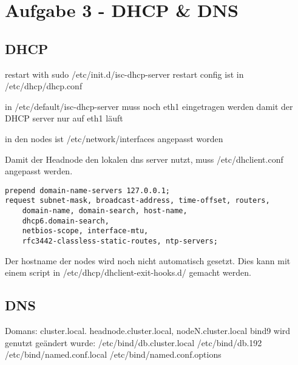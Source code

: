 \chapter{Aufgabe 3 - DHCP \& DNS}
\section{DHCP}
restart with
sudo /etc/init.d/isc-dhcp-server restart
config ist in /etc/dhcp/dhcp.conf

in /etc/default/isc-dhcp-server muss noch eth1 eingetragen werden damit der DHCP server nur auf eth1 läuft

in den nodes ist /etc/network/interfaces angepasst worden

Damit der Headnode den lokalen dns server nutzt, muss /etc/dhclient.conf angepasst werden.

\begin{lstlisting}[style=Bash]
prepend domain-name-servers 127.0.0.1;
request subnet-mask, broadcast-address, time-offset, routers,
	domain-name, domain-search, host-name,
	dhcp6.domain-search,
	netbios-scope, interface-mtu,
	rfc3442-classless-static-routes, ntp-servers;
\end{lstlisting}
Der hostname der nodes wird noch nicht automatisch gesetzt. Dies kann mit einem script in /etc/dhcp/dhclient-exit-hooks.d/ gemacht werden.

\section{DNS}
Domans: cluster.local. headnode.cluster.local, nodeN.cluster.local
bind9 wird genutzt
geändert wurde:
/etc/bind/db.cluster.local
/etc/bind/db.192
/etc/bind/named.conf.local
/etc/bind/named.conf.options

